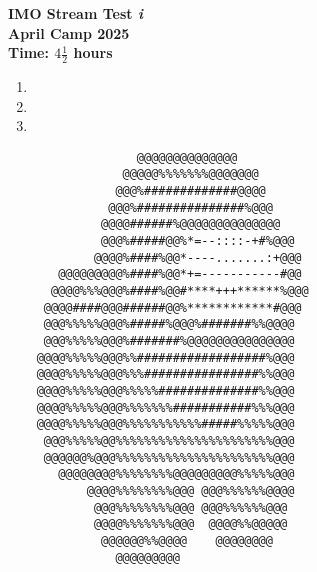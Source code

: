\documentclass{article}
\begin{document}
\thispagestyle{empty}

\begin{center}
  \textbf{\Large IMO Stream Test \textit{i}}
  \\ \vspace{1em}
  \textbf{\large April Camp 2025}
  \\ \vspace{1em}
  \textbf{\large Time: $4\frac{1}{2}$ hours}
\end{center}

\bigskip

\begin{enumerate}
\item %
\item %
\item %
\end{enumerate}


\vfill
\centering
\tiny %
\begin{BVerbatim}                                                       
                  @@@@@@@@@@@@@@                  
                @@@@@%
               @@@%
              @@@%
             @@@@######%
             @@@%
            @@@@%
       @@@@@@@@@%
      @@@@%
     @@@@####@@@######@@%
     @@@%
     @@@%
    @@@@%
    @@@@%
    @@@@%
    @@@@%
    @@@@%
     @@@%
     @@@@@@%
       @@@@@@@@%
           @@@@%
            @@@%
            @@@@%
             @@@@@@%
               @@@@@@@@@                          
                                                  
                                                  
\end{BVerbatim}
\end{document}
